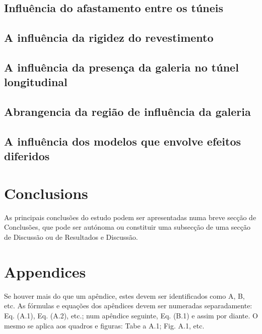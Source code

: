 \documentclass[a4paper,fleqn]{cas-sc}
\begin{document}
\subsection{Influência do afastamento entre os túneis}\label{}

\subsection{A influência da rigidez do revestimento}\label{}

\subsection{A influência da presença da galeria no túnel longitudinal}\label{}

\subsection{Abrangencia da região de influência da galeria}\label{}

\subsection{A influência dos modelos que envolve efeitos diferidos}\label{}

\section{Conclusions}\label{}

As principais conclusões do estudo podem ser apresentadas numa breve secção de Conclusões, que pode ser autónoma ou constituir uma subsecção de uma secção de Discussão ou de Resultados e Discussão.

\section{Appendices}\label{}

Se houver mais do que um apêndice, estes devem ser identificados como A, B, etc. As fórmulas e equações dos apêndices devem ser numeradas separadamente: Eq. (A.1), Eq. (A.2), etc.; num apêndice seguinte,
Eq. (B.1) e assim por diante. O mesmo se aplica aos quadros e figuras: Tabe a A.1; Fig. A.1, etc.

\end{document}
